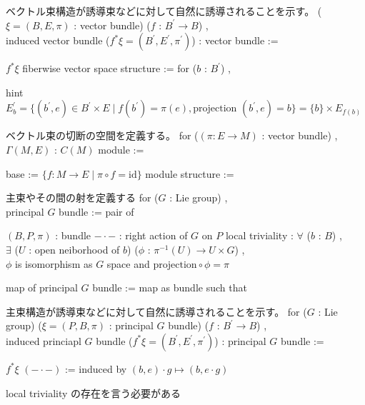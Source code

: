\begin{Definition}
\itemnote
  ベクトル束構造が誘導束などに対して自然に誘導されることを示す。
\itemdefi
  \For (\(\xi = (B , E , \pi)\) : vector bundle) (\(f\) : \(B^{\prime} \to B\)) ,\\
  \Define induced vector bundle (\(f^*\xi = (B^{\prime} , E^{\prime} , \pi^{\prime})\)) : vector bundle :=
  \begin{itemize}
    \itemenum \(f^*\xi\)
    \itemenum fiberwise vector space structure :=
      for (\(b\) : \(B^{\prime}\)) , 
  \end{itemize}
  hint \(E^{\prime}_b = \{(b^{\prime} , e) \in B^{\prime} \times E \mid f(b^{\prime}) = \pi(e) , \text{projection }(b^{\prime} , e) = b\} = \{b\} \times E_{f(b)}\)
\end{Definition}

\begin{Definition}
\itemnote
  ベクトル束の切断の空間を定義する。
\itemdefi
  for (\((\pi : E \to M)\) : vector bundle) ,\\
  \(\Gamma(M , E)\) : \(C(M)\) module :=
  \begin{itemize}
    \itemenum base := \(\{f : M \to E \mid \pi \circ f = \text{id}\}\)
    \itemenum module structure := 
  \end{itemize}
\end{Definition}

\begin{Definition}
\itemnote
  主束やその間の射を定義する
\itemdefi
  for (\(G\) : Lie group) ,\\
  principal \(G\) bundle := pair of
  \begin{itemize}
    \itemenum \((B , P , \pi)\) : bundle
    \itemenum \(- \cdot -\) : right action of \(G\) on \(P\)
    \itemwith local triviality :
      \(\forall\) (\(b\) : \(B\)) ,\\
      \(\exists\) (\(U\) : open neiborhood of \(b\)) (\(\phi\) : \(\pi^{-1}(U) \to U \times G\)) , \\
      \(\phi\) is isomorphism as \(G\) space and \(\text{projection} \circ \phi = \pi\)
  \end{itemize}
\itemdefi
  map of principal \(G\) bundle := map as bundle such that 
\end{Definition}

\begin{Definition}
\itemnote
  主束構造が誘導束などに対して自然に誘導されることを示す。
\itemdefi
  for (\(G\) : Lie group) (\(\xi = (P , B , \pi)\) : principal \(G\) bundle) (\(f\) : \(B^{\prime} \to B\)) ,\\
  induced princiapl \(G\) bundle (\(f^*\xi = (B^{\prime} , E^{\prime} , \pi^{\prime})\)) : principal \(G\) bundle :=
  \begin{itemize}
    \itemenum \(f^*\xi\)
    \itemenum \((- \cdot -)\) := induced by \((b , e) \cdot g \mapsto (b , e \cdot g)\)
  \end{itemize}
\itemprof
  local triviality の存在を言う必要がある \WIP
\end{Definition}

